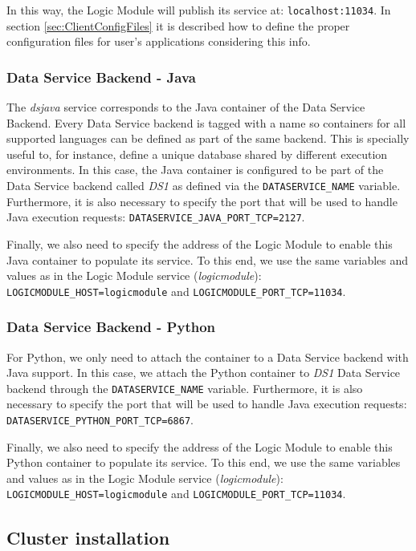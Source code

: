 In this way, the Logic Module will publish its service at: \texttt{localhost:11034}. In section \ref{sec:ClientConfigFiles} it is described how to define the proper configuration files for user's applications considering this info.

\subsubsection{Data Service Backend - Java}
The \textit{dsjava}  service corresponds to the Java container of the Data Service Backend. Every Data Service backend is tagged with a name so containers for all supported languages can be defined as part of the same backend. This is specially useful to, for instance, define a unique database shared by different execution environments. In this case, the Java container is configured to be part of the Data Service backend called \textit{DS1} as defined via the \texttt{DATASERVICE\_NAME} variable. Furthermore, it is also necessary to specify the port that will be used to handle Java execution requests: \texttt{DATASERVICE\_JAVA\_PORT\_TCP=2127}.

Finally, we also need to specify the address of the Logic Module to enable this Java container to populate its service. To this end, we use the same variables and values as in the Logic Module service (\textit{logicmodule}): \texttt{LOGICMODULE\_HOST=logicmodule} and \texttt{LOGICMODULE\_PORT\_TCP=11034}.

\subsubsection{Data Service Backend - Python}
For Python, we only need to attach the container to a Data Service backend with Java support. In this case, we attach the Python container to \textit{DS1} Data Service backend through the \texttt{DATASERVICE\_NAME} variable. Furthermore, it is also necessary to specify the port that will be used to handle Java execution requests: \texttt{DATASERVICE\_PYTHON\_PORT\_TCP=6867}.

Finally, we also need to specify the address of the Logic Module to enable this Python container to populate its service. To this end, we use the same variables and values as in the Logic Module service (\textit{logicmodule}): \texttt{LOGICMODULE\_HOST=logicmodule} and \texttt{LOGICMODULE\_PORT\_TCP=11034}.

\subsection{Cluster installation}


